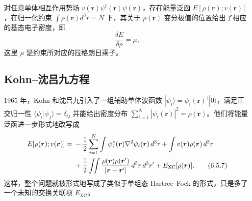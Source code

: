 \begin{keybox}
对任意单体相互作用势场 $v(\bm r)\psi^\dagger(\bm r)\psi(\bm r)$，存在能量泛函 $E[\rho(\bm r);v(\bm r)]$，在归一化约束 $\int\rho(\bm r)d^3r=N$ 下，其关于 $\rho(\bm r)$ 变分极值的位置给出了相应的基态电子密度，即
\begin{equation}
 \frac{\delta E}{\delta\rho}=\mu,
\tag{6.5.6}
\end{equation}
这里 $\mu$ 是约束所对应的拉格朗日乘子。
\end{keybox}


\subsection{Kohn--沈吕九方程}

1965 年，Kohn 和沈吕九引入了一组辅助单体波函数 $|\psi_i\rangle=\psi_i(\bm r)^\dagger|0\rangle$，满足正交归一性 $\langle\psi_i|\psi_j\rangle=\delta_{ij}$ 并能给出密度分布 $\sum_{i=1}^{N}|\psi_i(\bm r)|^2=\rho(\bm r)$。他们将能量泛函进一步形式地\mbox{改写成}
\begin{align}
 E[\rho(\bm r);v(\bm r)]={}&-\frac12\sum_{i=1}^{N}\int\psi_i^*(\bm r)\nabla^2\psi_i(\bm r)\,d^3r
 +\int v(\bm r)\rho(\bm r)\,d^3r\notag\\
 &+\frac12\iint\frac{\rho(\bm r)\rho(\bm r')}{|\bm r-\bm r'|}\,d^3r\,d^3r'
 +E_{\mathrm{XC}}[\rho(\bm r)].
\tag{6.5.7}
\end{align}
这样，整个问题就被形式地写成了类似于单组态 Hartree--Fock 的形式，只是多了一个未知的交换关联项 $E_{\mathrm{XC}}$。

